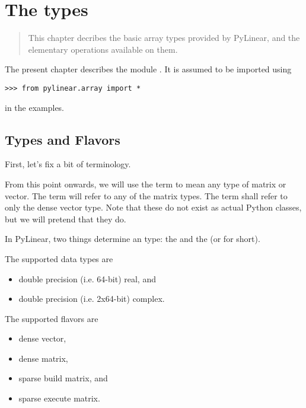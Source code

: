 \chapter{The  types}
\begin{quote}
   This chapter decribes the basic array types provided by PyLinear, and
   the elementary operations available on them.
\end{quote}

The present chapter describes the module . It is
assumed to be imported using
\begin{verbatim}
>>> from pylinear.array import *
\end{verbatim}
in the examples.

\section{Types and Flavors}
\label{sec:types-and-flavors}

First, let's fix a bit of terminology. 

From this point onwards, we will use the term 
to mean any type of matrix or vector. The term 
will refer to any of the matrix types. The term 
shall refer to only the dense vector type. Note that these do not exist as
actual Python classes, but we will pretend that they do.

In PyLinear, two things determine an  type: the
 and the  (or
 for short).

The supported data types are
\begin{itemize}
  \item double precision (i.e. 64-bit) real, and
  \item double precision (i.e. 2x64-bit) complex.
\end{itemize}

The supported flavors are
\begin{itemize}
  \item dense vector,
  \item dense matrix,
  \item sparse build matrix, and
  \item sparse execute matrix.
\end{itemize}

